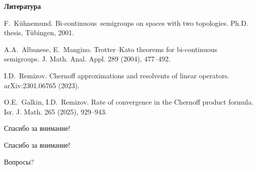 \documentclass[11pt]{article}
\begin{document}
\newpage

\begin{center}
{\color{notaeYELLOW}\bfseries\fontsize{44}{52}\selectfont Литература}
\end{center}
\vspace*{\fill}
\begin{center}
\fontsize{36}{43}\selectfont
\parbox{\linewidth}{\centering\noindent [1] F.~Kühnemund. Bi-continuous\ semigroups on spaces with two topologies. Ph.D. thesis, Tübingen, 2001.
\par}\vspace{0.4in}
\parbox{\linewidth}{\centering\noindent [2] A.A.~Albanese, E.~Mangino. Trotter--Kato theorems for bi-continuous semigroups. J. Math. Anal. Appl. 289 (2004), 477--492.
\par}\vspace{0.4in}
\parbox{\linewidth}{\centering\noindent [3] I.D.~Remizov. Chernoff approximations and resolvents of linear operators. arXiv:2301.06765 (2023).
\par}\vspace{0.4in}
\parbox{\linewidth}{\centering\noindent [4] O.E.~Galkin, I.D.~Remizov. Rate of convergence in the Chernoff product formula. Isr. J. Math. 265 (2025), 929--943.
\par}\vspace{0.4in}
\end{center}
\vspace*{\fill}

\newpage

\vspace*{\fill}
\begin{center}
\fontsize{36}{43}\selectfont
\parbox{\linewidth}{\centering\noindent \Huge Спасибо за внимание!
\par}\vspace{0.4in}
\end{center}
\vspace*{\fill}

\newpage

\vspace*{\fill}
\begin{center}
\fontsize{36}{43}\selectfont
\parbox{\linewidth}{\centering\noindent \Huge Спасибо за внимание!
\par}\vspace{0.4in}
\parbox{\linewidth}{\centering\noindent \Large Вопросы?
\par}\vspace{0.4in}
\end{center}
\vspace*{\fill}

\newpage
\end{document}
